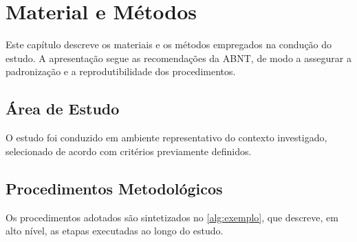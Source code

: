 \chapter{Material e Métodos}
\label{cap:material-e-metodos}


Este capítulo descreve os materiais e os métodos empregados na condução do estudo. A apresentação segue as recomendações da \gls{ABNT}, de modo a assegurar a padronização e a reprodutibilidade dos procedimentos.

\section{Área de Estudo}
\label{sec:area-de-estudo}

O estudo foi conduzido em ambiente representativo do contexto investigado, selecionado de acordo com critérios previamente definidos.

\section{Procedimentos Metodológicos}
\label{sec:procedimentos-metodologicos}

Os procedimentos adotados são sintetizados no \autoref{alg:exemplo}, que descreve, em alto nível, as etapas executadas ao longo do estudo.

\begin{algorithm}[!htbp]
    \SetSpacedAlgorithm
    \caption{\label{alg:exemplo}Procedimento geral adotado no estudo}
\end{algorithm}

%

